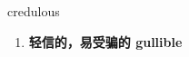 
\begin{frame}
{\huge credulous}
\begin{center}
\begin{enumerate}\Large
  \item \textbf{轻信的，易受骗的 gullible}
\end{enumerate}
\end{center}
\end{frame}
